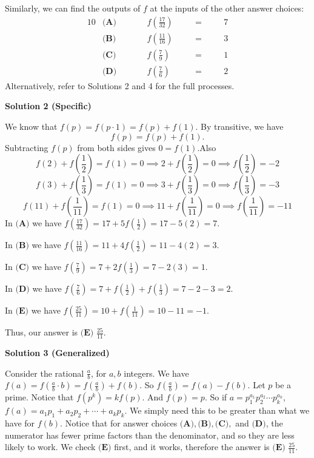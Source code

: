\begin{enumerate}
 Similarly, we can find the outputs of $f$ at the inputs of the other answer choices:
 \begin{alignat*}{10} &\textbf{(A)} \qquad && f\left(\frac{17}{32}\right) \quad && = \quad && 7 \\  &\textbf{(B)} \qquad && f\left(\frac{11}{16}\right) \quad && = \quad && 3 \\  &\textbf{(C)} \qquad && f\left(\frac{7}{9}\right) \quad && = \quad && 1 \\  &\textbf{(D)} \qquad && f\left(\frac{7}{6}\right) \quad && = \quad && 2 \end{alignat*}Alternatively, refer to Solutions 2 and 4 for the full processes.

 



\textbf{Solution 2 (Specific)}

We know that $f(p) = f(p \cdot 1) = f(p) + f(1)$. By transitive, we have 
 \[f(p) = f(p) + f(1).\]Subtracting $f(p)$ from both sides gives $0 = f(1).$Also
 \[f(2)+f\left(\frac{1}{2}\right)=f(1)=0 \implies 2+f\left(\frac{1}{2}\right)=0 \implies f\left(\frac{1}{2}\right) = -2\]
 \[f(3)+f\left(\frac{1}{3}\right)=f(1)=0 \implies 3+f\left(\frac{1}{3}\right)=0 \implies f\left(\frac{1}{3}\right) = -3\]
 \[f(11)+f\left(\frac{1}{11}\right)=f(1)=0 \implies 11+f\left(\frac{1}{11}\right)=0 \implies f\left(\frac{1}{11}\right) = -11\]In $\textbf{(A)}$ we have $f\left(\frac{17}{32}\right)=17+5f\left(\frac{1}{2}\right)=17-5(2)=7$.

 In $\textbf{(B)}$ we have $f\left(\frac{11}{16}\right)=11+4f\left(\frac{1}{2}\right)=11-4(2)=3$.

 In $\textbf{(C)}$ we have $f\left(\frac{7}{9}\right)=7+2f\left(\frac{1}{3}\right)=7-2(3)=1$.

 In $\textbf{(D)}$ we have $f\left(\frac{7}{6}\right)=7+f\left(\frac{1}{2}\right)+f\left(\frac{1}{3}\right)=7-2-3=2$.

 In $\textbf{(E)}$ we have $f\left(\frac{25}{11}\right)=10+f\left(\frac{1}{11}\right)=10-11=-1$.

 Thus, our answer is $\boxed{\textbf{(E) }\frac{25}{11}}$.

 



\textbf{Solution 3 (Generalized)}

Consider the rational $\frac{a}{b}$, for $a,b$ integers. We have $f(a)=f\left(\frac{a}{b}\cdot b\right)=f\left(\frac{a}{b}\right)+f(b)$. So $f\left(\frac{a}{b}\right)=f(a)-f(b)$. Let $p$ be a prime. Notice that $f(p^k)=kf(p)$. And $f(p)=p$. So if $a=p_1^{a_1}p_2^{a_2}\cdots p_k^{a_k}$, $f(a)=a_1p_1+a_2p_2+\cdots+a_kp_k$. We simply need this to be greater than what we have for $f(b)$. Notice that for answer choices $\textbf{(A)},\textbf{(B)},\textbf{(C)},$ and $\textbf{(D)}$, the numerator has fewer prime factors than the denominator, and so they are less likely to work. We check $\textbf{(E)}$ first, and it works, therefore the answer is $\boxed{\textbf{(E) }\frac{25}{11}}$.  


\end{enumerate}
